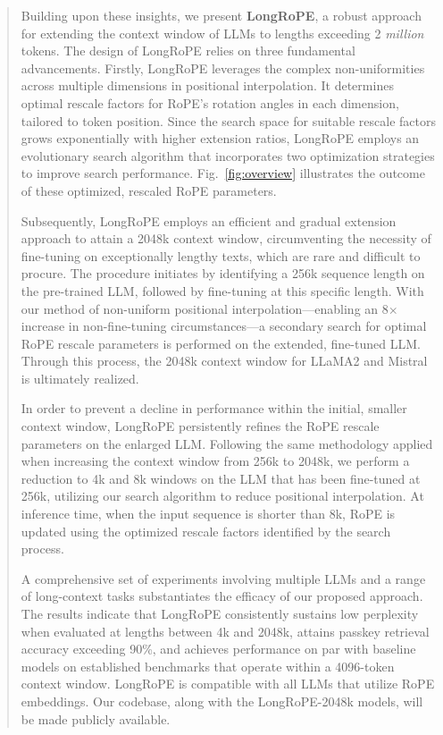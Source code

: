 \begin{abstract}
Building upon these insights, we present \textbf{LongRoPE}, a robust approach for extending the context window of LLMs to lengths exceeding 2 \emph{million} tokens. The design of LongRoPE relies on three fundamental advancements. Firstly, {LongRoPE} leverages the complex non-uniformities across multiple dimensions in positional interpolation. It determines optimal rescale factors for RoPE’s rotation angles in each dimension, tailored to token position. Since the search space for suitable rescale factors grows exponentially with higher extension ratios, {LongRoPE} employs an evolutionary search algorithm that incorporates two optimization strategies to improve search performance. Fig.~\ref{fig:overview} illustrates the outcome of these optimized, rescaled RoPE parameters.

Subsequently, {LongRoPE} employs an efficient and gradual extension approach to attain a 2048k context window, circumventing the necessity of fine-tuning on exceptionally lengthy texts, which are rare and difficult to procure. The procedure initiates by identifying a 256k sequence length on the pre-trained LLM, followed by fine-tuning at this specific length. With our method of non-uniform positional interpolation—enabling an 8$\times$ increase in non-fine-tuning circumstances—a secondary search for optimal RoPE rescale parameters is performed on the extended, fine-tuned LLM. Through this process, the 2048k context window for LLaMA2 and Mistral~\cite{mistral} is ultimately realized.

In order to prevent a decline in performance within the initial, smaller context window, {LongRoPE} persistently refines the RoPE rescale parameters on the enlarged LLM. Following the same methodology applied when increasing the context window from 256k to 2048k, we perform a reduction to 4k and 8k windows on the LLM that has been fine-tuned at 256k, utilizing our search algorithm to reduce positional interpolation. At inference time, when the input sequence is shorter than 8k, RoPE is updated using the optimized rescale factors identified by the search process.

A comprehensive set of experiments involving multiple LLMs and a range of long-context tasks substantiates the efficacy of our proposed approach. The results indicate that LongRoPE consistently sustains low perplexity when evaluated at lengths between 4k and 2048k, attains passkey retrieval accuracy exceeding 90\%, and achieves performance on par with baseline models on established benchmarks that operate within a 4096-token context window. LongRoPE is compatible with all LLMs that utilize RoPE embeddings. Our codebase, along with the LongRoPE-2048k models, will be made publicly available.


\end{abstract}
